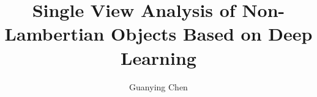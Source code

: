 \documentclass[a4paper,12pt,default,numbered,print]{Classes_final/PhDThesisPSnPDF}
\title{Single View Analysis of Non-Lambertian Objects Based on Deep Learning}
\author{Guanying Chen}
\begin{document}
\frontmatter

\begin{titlepage}
\maketitle
\end{titlepage}

\newcommand{\gy}[1]{\textcolor{red}{[gy: #1]}}
\newcommand{\kywong}[1]{\textcolor{blue}{[kywong: #1]}}
\newcommand{\tred}[1]{\textcolor{red}{#1}}
\newcommand{\rev}[1]{\textcolor{red}{#1}}
\newcommand{\old}[1]{\textcolor{blue}{#1}}






\tableofcontents
\listoffigures
\listoftables 

\mainmatter










\backmatter 

\begin{spacing}{1}




\cleardoublepage

\end{spacing}

\printthesisindex %
\end{document}
